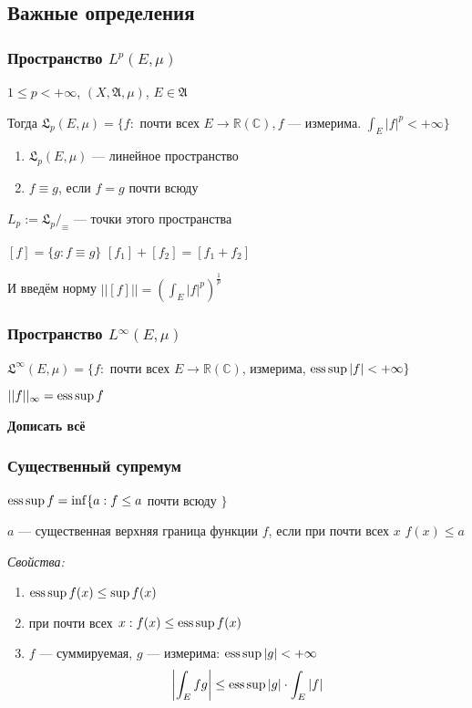 \documentclass{article}
\def\dbl{\,\,}
\begin{document}
\subsection{Важные определения}

\subsubsection{Пространство $L^p(E,\mu)$}
$1 \le p < +\infty$, $(X, \mathfrak{A}, \mu)$, $E \in \mathfrak{A}$

Тогда $\mathfrak{L}_p(E, \mu) = \{f:$ почти всех $E \rightarrow \mathbb{R} (\mathbb{C}), f$ --- измерима. $\int_{E} |f|^{p} < + \infty\}$

\begin{enumerate}
    \item $\mathfrak{L}_p(E, \mu)$ --- линейное пространство
    \item $f \equiv g$, если $f = g$ почти всюду
\end{enumerate}

$L_p := \mathfrak{L}_p /_{\equiv}$ --- точки этого пространства

$[f] = \{g: f \equiv g\}$
$[f_1] + [f_2] = [f_1 + f_2]$

И введём норму $||[f]|| = \left(\int_{E} |f|^{p}\right)^{\frac{1}{p}}$

\subsubsection{Пространство $L^\infty(E,\mu)$}

$\mathfrak{L}^{\infty}(E, \mu) = \{f: $ почти всех $E \rightarrow \mathbb{R} (\mathbb{C})$, измерима, $\operatorname*{ess\,sup} |f| < + \infty\}$

$||f||_{\infty} = \operatorname*{ess\,sup} f$

\textbf{Дописать всё}

\subsubsection{Существенный супремум}

$\operatorname*{ess\,sup} f = \inf \{a: f \le a $ почти всюду $\}$

$a$ --- существенная верхняя граница функции $f$, если при почти всех $x \dbl f(x) \le a$

\textit{Свойства: }
\begin{enumerate}
    \item $\operatorname*{ess\,sup} f(x) \le \sup f(x)$
    \item при почти всех $x: f(x) \le \operatorname*{ess\,sup} f(x)$
    \item $f$ --- суммируемая, $g$ --- измерима: $\operatorname*{ess\,sup} |g| < + \infty$
    \[\left|\int_{E} fg\right| \le \operatorname*{ess\,sup} |g| \cdot \int_{E} |f|\]
\end{enumerate}
\end{document}
